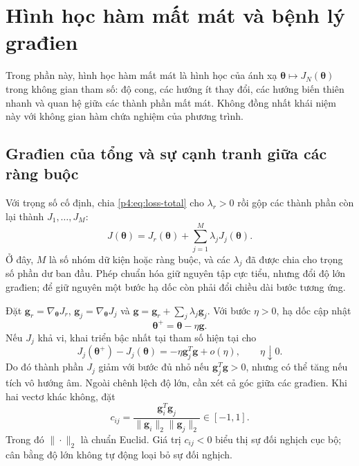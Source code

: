 \section{Hình học hàm mất mát và bệnh lý građien}
\label{sec:gradient-pathology}

Trong phần này, hình học hàm mất mát là hình học của ánh xạ
$\boldsymbol{\theta}\mapsto J_N(\boldsymbol{\theta})$ trong không gian
tham số: độ cong, các hướng ít thay đổi, các hướng biến thiên nhanh
và quan hệ giữa các thành phần mất mát. Không đồng nhất khái niệm này
với không gian hàm chứa nghiệm của phương trình.

\subsection{Građien của tổng và sự cạnh tranh giữa các ràng buộc}

Với trọng số cố định, chia \eqref{p4:eq:loss-total} cho
$\lambda_r>0$ rồi gộp các thành phần còn lại thành $J_1,\ldots,J_M$:
\begin{equation}
 J(\boldsymbol{\theta})=J_r(\boldsymbol{\theta})+
                         \sum_{j=1}^{M}\lambda_jJ_j(\boldsymbol{\theta}).
 \label{p4:eq:compact-loss}
\end{equation}
Ở đây, $M$ là số nhóm dữ kiện hoặc ràng buộc, và các $\lambda_j$ đã
được chia cho trọng số phần dư ban đầu. Phép chuẩn hóa giữ nguyên tập
cực tiểu, nhưng đổi độ lớn građien; để giữ nguyên một bước hạ dốc còn
phải đổi chiều dài bước tương ứng.

Đặt $\mathbf{g}_r=\nabla_{\boldsymbol{\theta}}J_r$,
$\mathbf{g}_j=\nabla_{\boldsymbol{\theta}}J_j$ và
$\mathbf{g}=\mathbf{g}_r+\sum_j\lambda_j\mathbf{g}_j$.
Với bước $\eta>0$, hạ dốc cập nhật
\begin{equation}
 \boldsymbol{\theta}^{+}=\boldsymbol{\theta}-\eta\mathbf{g}.
 \label{p4:eq:gradient-step}
\end{equation}
Nếu $J_j$ khả vi, khai triển bậc nhất tại tham số hiện tại cho
\begin{equation}
 J_j(\boldsymbol{\theta}^{+})-J_j(\boldsymbol{\theta})
 =-\eta\mathbf{g}_j^T\mathbf{g}+o(\eta),
 \qquad \eta\downarrow0.
 \label{p4:eq:individual-change}
\end{equation}
Do đó thành phần $J_j$ giảm với bước đủ nhỏ nếu
$\mathbf{g}_j^T\mathbf{g}>0$, nhưng có thể tăng nếu tích vô hướng âm.
Ngoài chênh lệch độ lớn, cần xét cả góc giữa các građien. Khi hai
vectơ khác không, đặt
\begin{equation}
 c_{ij}=\frac{\mathbf{g}_i^T\mathbf{g}_j}
                    {\|\mathbf{g}_i\|_2\|\mathbf{g}_j\|_2}\in[-1,1].
 \label{p4:eq:cosine}
\end{equation}
Trong đó $\|\cdot\|_2$ là chuẩn Euclid. Giá trị $c_{ij}<0$ biểu thị
sự đối nghịch cục bộ; cân bằng độ lớn không tự động loại bỏ sự đối nghịch.

